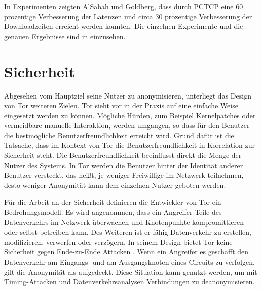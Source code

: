 \documentclass[fleqn,envcountsame,runningheads,10pt,a4paper]{llncs}
\begin{document}
In Experimenten zeigten AlSabah und Goldberg, dass durch PCTCP eine 60 
prozentige Verbesserung der Latenzen und circa 30 prozentige Verbesserung der 
Downloadzeiten erreicht werden konnten. Die einzelnen Experimente und die 
genauen Ergebnisse sind in \cite{pctcp} einzusehen.

\section{Sicherheit}\label{sec:discussion}


Abgesehen vom Hauptziel seine Nutzer zu anonymisieren, unterliegt das Design von 
Tor weiteren Zielen. Tor sieht vor in der Praxis auf eine einfache Weise 
eingesetzt werden zu können. Mögliche Hürden, zum Beispiel Kernelpatches oder 
vermeidbare manuelle Interaktion, werden umgangen, so dass für den Benutzer die 
bestmögliche Benutzerfreundlichkeit erreicht wird. Grund dafür ist die Tatsache, 
dass im Kontext von Tor die Benutzerfreundlichkeit in Korrelation zur Sicherheit 
steht. Die Benutzerfreundlichkeit beeinflusst direkt die Menge der Nutzer des 
Systems. In Tor werden die Benutzer hinter der Identität anderer Benutzer 
versteckt, das heißt, je weniger Freiwillige im Netzwerk teilnehmen, desto 
weniger Anonymität kann dem einzelnen Nutzer geboten werden.

Für die Arbeit an der Sicherheit definieren die Entwickler von Tor ein 
Bedrohungsmodell. Es wird angenommen, dass ein Angreifer Teile des Datenverkehrs 
im Netzwerk überwachen und Knotenpunkte kompromittieren oder selbst betreiben 
kann. Des Weiteren ist er fähig Datenverkehr zu erstellen, modifizieren, 
verwerfen oder verzögern. In seinem Design bietet Tor keine Sicherheit gegen 
Ende-zu-Ende Attacken \cite{tor}. Wenn ein Angreifer es geschafft den 
Datenverkehr am Eingangs- und am Ausgangsknoten eines Circuits zu verfolgen, 
gilt die Anonymität als aufgedeckt. Diese Situation kann genutzt werden, um mit 
Timing-Attacken und Datenverkehrsanalysen Verbindungen zu deanonymisieren.
\end{document}
